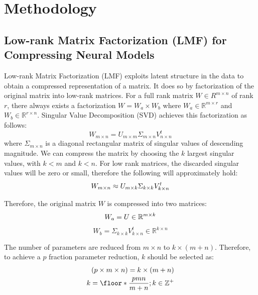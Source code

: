 \section{Methodology}
\label{sec:method}
\subsection{Low-rank Matrix Factorization (LMF) for Compressing Neural Models}
\label{sec:method_svd}
Low-rank Matrix Factorization (LMF) exploits latent structure in the data to obtain a
compressed representation of a matrix. It does so by factorization of the
original matrix into low-rank matrices. For a full rank matrix $W
\in R^{m\times n}$ of rank $r$, there always exists a factorization $W=W_a
\times W_b$ where $W_a \in \mathbb{R}^{m \times r}$ and $W_b \in \mathbb{R}^{r \times n}$. Singular Value Decomposition (SVD) \cite{golub1970singular} achieves this factorization as follows:
\begin{equation}\label{eq1}
W_{m\times n} = U_{m\times m}\Sigma_{m\times n}V^{t}_{n\times n} 
\end{equation}
where $\Sigma_{m\times n}$ is a diagonal rectangular matrix of singular values of descending
magnitude.  We can compress the matrix by choosing the $k$ largest singular
values, with $k<m$ and $k<n$. For low rank matrices, the discarded singular values will be zero or small, therefore the following will approximately hold:
\begin{equation}\label{eq2}
W_{m\times n} \approx U_{m\times k}\Sigma_{k\times k}V^{t}_{k\times n} \newline
\end{equation}

Therefore, the original matrix $W$ is compressed into two matrices:
\begin{equation}\label{eq3}
W_a = U \in \mathbb{R}^{m \times k} \newline
\end{equation}
\begin{equation}\label{eq4}
W_b = \Sigma_{k\times k}V^{t}_{k\times n} \in \mathbb{R}^{k \times n}
\end{equation}

The number of parameters are reduced from $m \times n$ to $k\times(m +
n)$. Therefore, to achieve a $p$ fraction parameter reduction, $k$ should be
selected as:
\begin{align}\label{eq5}
(p \times m \times n) =  k \times (m + n) \notag \\
k = \floor* {\frac{pmn}{m + n}} ;  k \in \mathbb{Z}^{+} 
\end{align}

